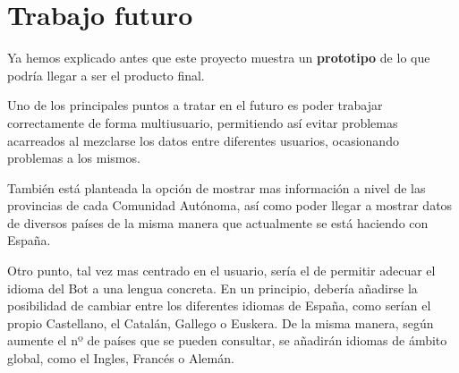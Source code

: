 \chapter{Trabajo futuro}

Ya hemos explicado antes que este proyecto muestra un \textbf{prototipo} de lo que podría llegar a ser el producto final.

Uno de los principales puntos a tratar en el futuro es poder trabajar correctamente de forma multiusuario, permitiendo así evitar problemas acarreados al mezclarse los datos entre diferentes usuarios, ocasionando problemas a los mismos.

También está planteada la opción de mostrar mas información a nivel de las provincias de cada Comunidad Autónoma, así como poder llegar a mostrar datos de diversos países de la misma manera que actualmente se está haciendo con España.

Otro punto, tal vez mas centrado en el usuario, sería el de permitir adecuar el idioma del Bot a una lengua concreta. En un principio, debería añadirse la posibilidad de cambiar entre los diferentes idiomas de España, como serían el propio Castellano, el Catalán, Gallego o Euskera. De la misma manera, según aumente el nº de países que se pueden consultar, se añadirán idiomas de ámbito global, como el Ingles, Francés o Alemán.